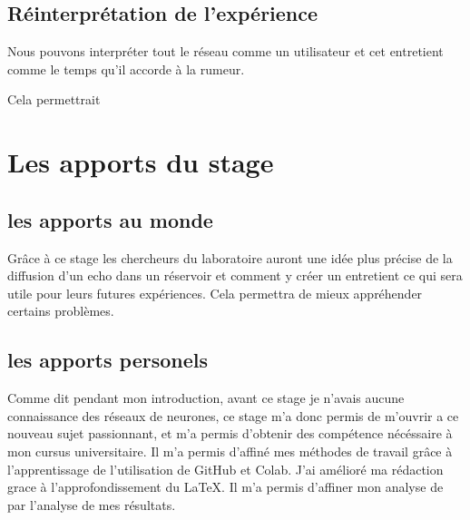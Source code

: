 \subsection{Réinterprétation de l'expérience}

Nous pouvons interpréter tout le réseau comme un utilisateur et cet entretient comme le temps qu'il accorde à la rumeur.

Cela permettrait
\section{Les apports du stage}
\subsection{les apports au monde}
Grâce à ce stage les chercheurs du laboratoire auront une idée plus précise de la diffusion d'un echo dans un réservoir et comment y créer un entretient ce qui sera utile pour leurs futures expériences. Cela permettra de mieux appréhender certains problèmes.
\subsection{les apports personels}
Comme dit pendant mon introduction, avant ce stage je n'avais aucune connaissance des réseaux de neurones, ce stage m'a donc permis de m'ouvrir a ce nouveau sujet passionnant, et m'a permis d'obtenir des compétence nécéssaire à mon cursus universitaire. Il m'a permis d'affiné mes méthodes de travail grâce à l'apprentissage de l'utilisation de GitHub et Colab. J'ai amélioré ma rédaction grace à l'approfondissement
du LaTeX. Il m'a permis d'affiner mon analyse de par l'analyse de mes résultats.

